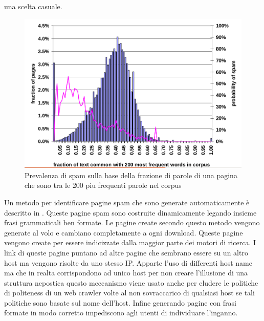 una scelta casuale.
\begin{figure}[htbp]
\centering
\includegraphics[width=12cm]{immagini/fetterly/fetterly9}
\caption{Prevalenza di spam sulla base della frazione di parole di una pagina che sono tra le 200 piu frequenti parole nel corpus}
\label{fig:fetterly9}
\end{figure}

Un metodo per identificare pagine spam che sono generate automaticamente è descritto in \cite{Fetterly:2005:DPD:1076034.1076066}. Queste pagine spam sono  costruite dinamicamente legando insieme frasi grammaticali ben formate. Le pagine create secondo questo metodo vengono generate al volo e cambiano completamente a ogni download. Queste pagine vengono create per essere indicizzate dalla maggior parte dei motori di ricerca. I link di queste pagine puntano ad altre pagine che sembrano essere su un altro host ma vengono risolte da uno stesso IP. Apparte l'uso di differenti host name ma che in realta corrispondono ad unico host per non creare l'illusione di una struttura nepostica questo meccanismo viene usato anche per eludere le politiche di politeness di un web crawler volte al non sovraccarico di qualsiasi host se tali politiche sono basate sul nome dell'host. Infine generando pagine con frasi formate in modo corretto impediscono agli utenti di individuare l'inganno.

